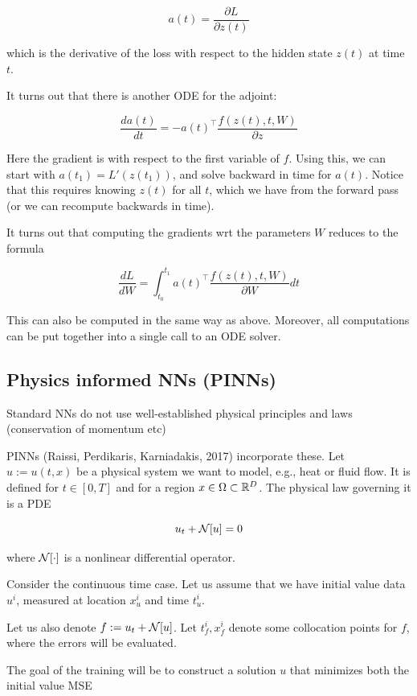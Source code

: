 \documentclass[english]{article}
\begin{document}
$$a(t) = \frac{\partial L}{\partial z(t)}$$

which is the derivative of the loss with respect to the hidden state $z(t)$ at time $t$.

\item It turns out that there is another ODE for the adjoint: 

$$\frac{da(t)}{dt} = -a(t)^\top  \frac{f(z(t),t,W)}{\partial z} $$

Here the gradient is with respect to the first variable of $f$. Using this, we can start with $a(t_1) = L'(z(t_1))$, and solve backward in time for $a(t)$. Notice that this requires knowing $z(t)$ for all $t$, which we have from the forward pass (or we can recompute backwards in time).

\item It turns out that computing the gradients wrt the parameters $W$ reduces to the formula

$$\frac{dL}{dW} = \int_{t_0}^{t_1}  a(t)^\top  \frac{f(z(t),t,W)}{\partial W} dt$$

This can also be computed in the same way as above. Moreover, all computations can be put together into a single call to an ODE solver.
\eitem 


\subsection{Physics informed NNs (PINNs)}
%
\bitem
\item Standard NNs do not use well-established physical principles and laws (conservation of momentum etc)

\item PINNs (Raissi, Perdikaris, Karniadakis, 2017) incorporate these. Let $u:=u(t,x)$ be a physical system we want to model, e.g., heat or fluid flow. It is defined for $t\in[0,T]$ and for a region $x\in\Omega\subset \mathbb{R}^D$. The physical law governing it is a PDE

$$u_t +\mathcal{N}[u]=0$$

where $\mathcal{N}[\cdot]$ is a nonlinear differential operator.

\item Consider the continuous time case. Let us assume that we have initial value data $u^i$, measured at location $x_u^i$ and time $t_u^i$. 

Let us also denote $f:=u_t +\mathcal{N}[u]$. Let $t_f^i,x_f^i$ denote some collocation points for $f$, where the errors will be evaluated. 

The goal of the training will be to construct a solution $u$ that minimizes both the initial value MSE
\end{document}
